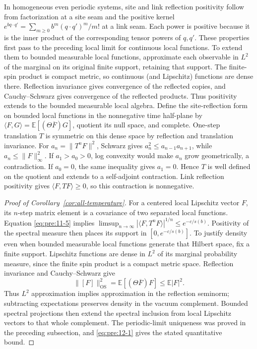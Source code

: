 In homogeneous even periodic systems, site and link reflection positivity follow from factorization at a site seam and the positive kernel
\(e^{bq\cdot q'}=\sum_{m\geq0}b^m(q\cdot q')^m/m!\) at a link seam. Each
power is positive because it is the inner product of the corresponding
tensor powers of \(q,q'\). These properties first pass to the preceding local limit for continuous
local functions. To extend them to bounded measurable local functions,
approximate each observable in $L^2$ of the marginal on its original
finite support, retaining that support. The finite-spin product is compact
metric, so continuous (and Lipschitz) functions are dense there. Reflection
invariance gives convergence of the reflected copies, and Cauchy--Schwarz
gives convergence of the reflected products. Thus positivity extends
to the bounded measurable local algebra. Define the site-reflection form on bounded local functions in the
nonnegative time half-plane by
\(\langle F,G\rangle=\mathbb E[(\Theta\overline F)G]\), quotient its null
space, and complete. One-step translation \(T\) is symmetric on this dense
space by reflection and translation invariance. For
\(a_n=\|T^nF\|^2\), Schwarz gives \(a_n^2\leq a_{n-1}a_{n+1}\), while
\(a_n\leq\|F\|_\infty^2\). If \(a_1>a_0>0\), log convexity would make
\(a_n\) grow geometrically, a contradiction. If \(a_0=0\), the same
inequality gives \(a_1=0\). Hence \(T\) is well defined on the quotient
and extends to a self-adjoint contraction. Link reflection positivity
gives \(\langle F,TF\rangle\geq0\), so this contraction is nonnegative.

\begin{proof}[Proof of Corollary~\ref{cor:all-temperature}]
For a centered local Lipschitz vector \(F\), its \(n\)-step matrix element is a covariance of two separated local functions. Equation \eqref{eq:pre:11-5} implies
\(\limsup_{n\to\infty}|\langle F,T^nF\rangle|^{1/n}\leq e^{-c/s(b)}\).
Positivity of the spectral measure then places its support in \([0,e^{-c/s(b)}]\). To justify density even when bounded measurable local functions generate
that Hilbert space, fix a finite support. Lipschitz functions are dense in
$L^2$ of its marginal probability measure, since the finite spin product
is a compact metric space. Reflection invariance and Cauchy--Schwarz give
\[
 \|[F]\|_{\mathrm{OS}}^2
 =\mathbb E[(\Theta\overline F)F]\le\mathbb E|F|^2.
\]
Thus $L^2$ approximation implies approximation in the reflection
seminorm; subtracting expectations preserves density in the vacuum
complement. Bounded spectral projections then extend the spectral
inclusion from local Lipschitz vectors to that whole complement.
The periodic-limit uniqueness was proved in the preceding subsection,
and \eqref{eq:pre:12-1} gives the stated quantitative bound.
\end{proof}

